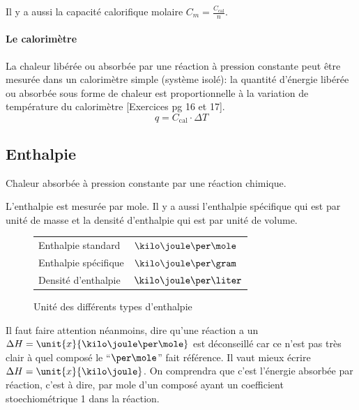 \documentclass[11pt,a4paper,french]{article}
\newcommand\ccal{C_\mathrm{cal}}
\begin{document}
Il y a aussi la capacité calorifique molaire $C_m = \frac{\ccal}{n}$.


\paragraph{Le calorimètre}
La chaleur libérée ou absorbée par une réaction à pression constante peut être mesurée dans un calorimètre simple (système isolé): la quantité d'énergie libérée ou absorbée sous forme de chaleur est proportionnelle à la variation de température du calorimètre [Exercices pg 16 et 17].
$$q=\ccal\cdot \Delta T$$

\subsection{Enthalpie} \label{sec:DH}
Chaleur absorbée à pression constante par une réaction chimique.

L'enthalpie est mesurée par mole.
Il y a aussi l'enthalpie spécifique qui est par unité de masse et la densité d'enthalpie qui est par unité de volume.

\begin{figure}[h!]
	\begin{center}
		\begin{tabular}{|ll|}
			\hline
			Enthalpie standard & $\kilo\joule\per\mole$\\
			Enthalpie spécifique & $\kilo\joule\per\gram$\\
			Densité d'enthalpie & $\kilo\joule\per\liter$\\
			\hline
		\end{tabular}
	\end{center}
	\label{fig:enthunit}
	\caption{Unité des différents types d'enthalpie}
\end{figure}

Il faut faire attention néanmoins, dire qu'une réaction a un $\Delta H = \unit{x}{\kilo\joule\per\mole}$ est déconseillé car ce n'est pas très clair à quel composé le ``$\per\mole$'' fait référence.
Il vaut mieux écrire $\Delta H = \unit{x}{\kilo\joule}$.
On comprendra que c'est l'énergie absorbée par réaction, c'est à dire, par mole d'un composé ayant un coefficient stoechiométrique 1 dans la réaction.
\end{document}
